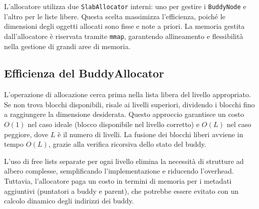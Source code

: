 L'allocatore utilizza due \texttt{SlabAllocator} interni: uno per gestire i \texttt{BuddyNode} e l'altro per le liste libere. Questa scelta massimizza l'efficienza, poiché le dimensioni degli oggetti allocati sono fisse e note a priori. La memoria gestita dall'allocatore è riservata tramite \texttt{mmap}, garantendo allineamento e flessibilità nella gestione di grandi aree di memoria.

\subsection{Efficienza del BuddyAllocator}

L'operazione di allocazione cerca prima nella lista libera del livello appropriato. Se non trova blocchi disponibili, risale ai livelli superiori, dividendo i blocchi fino a raggiungere la dimensione desiderata. Questo approccio garantisce un costo $O(1)$ nel caso ideale (blocco disponibile nel livello corretto) e $O(L)$ nel caso peggiore, dove $L$ è il numero di livelli. La fusione dei blocchi liberi avviene in tempo $O(L)$, grazie alla verifica ricorsiva dello stato del buddy.

L'uso di free lists separate per ogni livello elimina la necessità di strutture ad albero complesse, semplificando l'implementazione e riducendo l'overhead. Tuttavia, l'allocatore paga un costo in termini di memoria per i metadati aggiuntivi (puntatori a buddy e parent), che potrebbe essere evitato con un calcolo dinamico degli indirizzi dei buddy.
